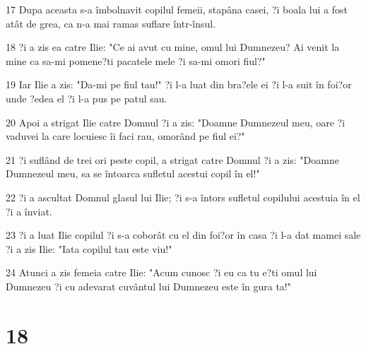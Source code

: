 \par 17 Dupa aceasta s-a îmbolnavit copilul femeii, stapâna casei, ?i boala lui a fost atât de grea, ca n-a mai ramas suflare într-însul.
\par 18 ?i a zis ea catre Ilie: "Ce ai avut cu mine, omul lui Dumnezeu? Ai venit la mine ca sa-mi pomene?ti pacatele mele ?i sa-mi omori fiul?"
\par 19 Iar Ilie a zis: "Da-mi pe fiul tau!" ?i l-a luat din bra?ele ei ?i l-a suit în foi?or unde ?edea el ?i l-a pus pe patul sau.
\par 20 Apoi a strigat Ilie catre Domnul ?i a zis: "Doamne Dumnezeul meu, oare ?i vaduvei la care locuiesc îi faci rau, omorând pe fiul ei?"
\par 21 ?i suflând de trei ori peste copil, a strigat catre Domnul ?i a zis: "Doamne Dumnezeul meu, sa se întoarca sufletul acestui copil în el!"
\par 22 ?i a ascultat Domnul glasul lui Ilie; ?i s-a întors sufletul copilului acestuia în el ?i a înviat.
\par 23 ?i a luat Ilie copilul ?i s-a coborât cu el din foi?or în casa ?i l-a dat mamei sale ?i a zis Ilie: "Iata copilul tau este viu!"
\par 24 Atunci a zis femeia catre Ilie: "Acum cunosc ?i eu ca tu e?ti omul lui Dumnezeu ?i cu adevarat cuvântul lui Dumnezeu este în gura ta!"

\chapter{18}

